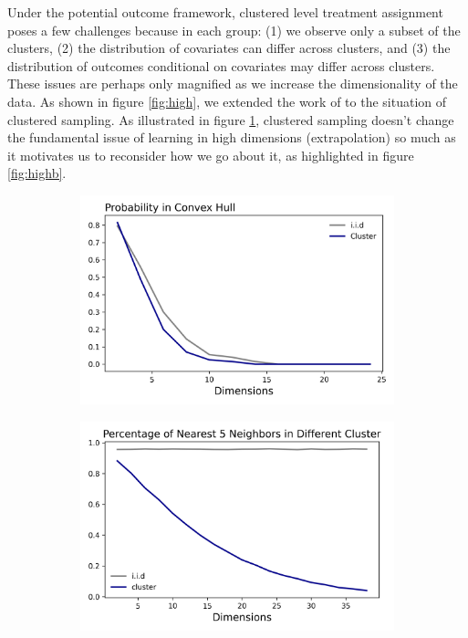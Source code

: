 \documentclass[a4paper,12pt]{article}
\begin{document}
Under the potential outcome framework, clustered level treatment assignment poses a few challenges because in each group: (1) we observe only a subset of the clusters, (2) the distribution of covariates can differ across clusters, and (3) the distribution of outcomes conditional on covariates may differ across clusters. These issues are perhaps only magnified as we increase the dimensionality of the data. As shown in figure \ref{fig:high}, we extended the work of \cite{balestriero2021learning} to the situation of clustered sampling. As illustrated in figure \ref{fig:higha}, clustered sampling doesn't change the fundamental issue of learning in high dimensions  (extrapolation) so much as it motivates us to reconsider how we go about it, as highlighted in figure \ref{fig:highb}.
\begin{figure}[htbp]
\centering
\begin{subfigure}{.48\textwidth}
    \centering
    \includegraphics[width=.95\linewidth]{figures/framework/iid_cluster.png}
    \caption{}
    \label{fig:higha}
\end{subfigure}
\begin{subfigure}{.48\textwidth}
    \centering
    \includegraphics[width=.95\linewidth]{figures/framework/nearest_neighbors_increasing_correlation.png}

\end{subfigure}
\end{figure}
\end{document}
